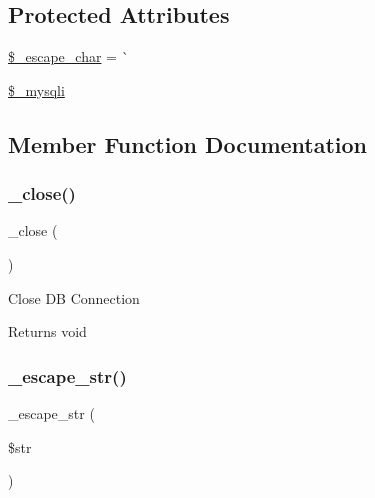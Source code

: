 \subsection*{Protected Attributes}
\begin{DoxyCompactItemize}
\item 
\mbox{\hyperlink{class_c_i___d_b__mysqli__driver_aaec2fb0112850159063a8e47ad3aed6e}{\$\+\_\+escape\+\_\+char}} = \textquotesingle{}\`{}\textquotesingle{}
\item 
\mbox{\hyperlink{class_c_i___d_b__mysqli__driver_ade098f0cd94dc706b24ea590bd540bf4}{\$\+\_\+mysqli}}
\end{DoxyCompactItemize}


\subsection{Member Function Documentation}
\mbox{\label{class_c_i___d_b__mysqli__driver_a4d9082658000e5ede8312067c6dda9db}} 
\subsubsection{\texorpdfstring{\+\_\+close()}{\_close()}}
{\footnotesize\ttfamily \+\_\+close (\begin{DoxyParamCaption}{ }\end{DoxyParamCaption})\hspace{0.3cm}{\ttfamily [protected]}}

Close DB Connection

\begin{DoxyReturn}{Returns}
void 
\end{DoxyReturn}
\mbox{\label{class_c_i___d_b__mysqli__driver_af8ef0237bfcdb19215b63fff769e7a55}} 
\subsubsection{\texorpdfstring{\+\_\+escape\+\_\+str()}{\_escape\_str()}}
{\footnotesize\ttfamily \+\_\+escape\+\_\+str (\begin{DoxyParamCaption}\item[{}]{\$str }\end{DoxyParamCaption})\hspace{0.3cm}{\ttfamily [protected]}}


